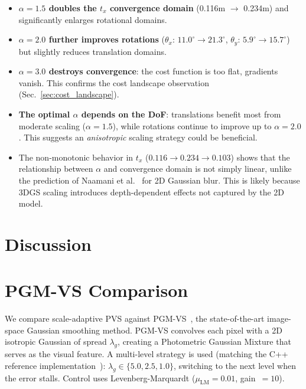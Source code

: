 \documentclass[11pt]{article}
\begin{document}
\begin{itemize}
    \item \textbf{$\alpha = 1.5$ doubles the $t_x$ convergence domain} (0.116m $\to$ 0.234m) and significantly enlarges rotational domains.
    \item \textbf{$\alpha = 2.0$ further improves rotations} ($\theta_x$: $11.0^\circ \to 21.3^\circ$, $\theta_y$: $5.9^\circ \to 15.7^\circ$) but slightly reduces translation domains.
    \item \textbf{$\alpha = 3.0$ destroys convergence}: the cost function is too flat, gradients vanish. This confirms the cost landscape observation (Sec.~\ref{sec:cost_landscape}).
    \item \textbf{The optimal $\alpha$ depends on the DoF}: translations benefit most from moderate scaling ($\alpha = 1.5$), while rotations continue to improve up to $\alpha = 2.0$. This suggests an \emph{anisotropic} scaling strategy could be beneficial.
    \item The non-monotonic behavior in $t_x$ ($0.116 \to 0.234 \to 0.103$) shows that the relationship between $\alpha$ and convergence domain is not simply linear, unlike the prediction of Naamani et al.~\cite{naamani2024iros} for 2D Gaussian blur. This is likely because 3DGS scaling introduces depth-dependent effects not captured by the 2D model.
\end{itemize}


\section{Discussion}
\label{sec:discussion}
\section{PGM-VS Comparison}
\label{sec:pgm_comparison}

We compare scale-adaptive PVS against PGM-VS~\cite{crombez2019tro}, the state-of-the-art image-space Gaussian smoothing method.
PGM-VS convolves each pixel with a 2D isotropic Gaussian of spread $\lambda_g$, creating a Photometric Gaussian Mixture that serves as the visual feature.
A multi-level strategy is used (matching the C++ reference implementation~\cite{crombez2019tro}): $\lambda_g \in \{5.0, 2.5, 1.0\}$, switching to the next level when the error stalls. Control uses Levenberg-Marquardt ($\mu_\text{LM} = 0.01$, gain~$= 10$).
\end{document}
